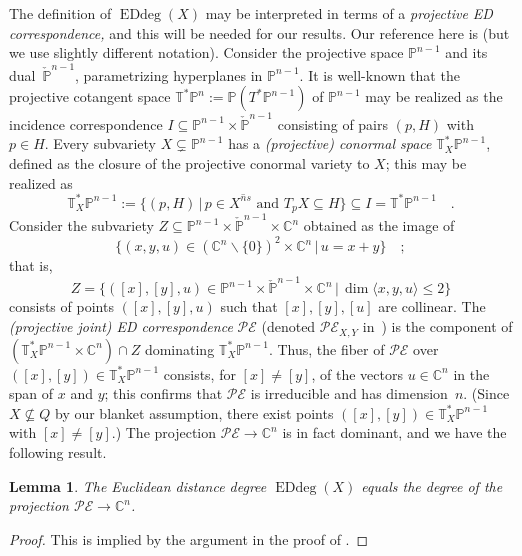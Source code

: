 \documentclass[11pt]{amsart}
\newtheorem{lemma}[theorem]{Lemma}
\numberwithin{equation}{section}
\newcommand{\Cbb}{{\mathbb{C}}}
\newcommand{\Pbb}{{\mathbb{P}}}
\newcommand{\cPbb}{{\check\Pbb}}
\newcommand{\Tbb}{{\mathbb{T}}}
\newcommand{\cE}{{\mathcal E}}
\newcommand{\cP}{{\mathcal P}}
\DeclareMathOperator{\Edd}{EDdeg}
\begin{document}
The definition of $\Edd(X)$ may be interpreted in terms of a {\em projective ED 
correspondence,\/} and this will be needed for our results. Our reference here is 
\cite[\S5]{MR3451425} (but we use slightly different notation).
Consider the projective space $\Pbb^{n-1}$ and its dual~$\cPbb^{n-1}$, parametrizing
hyperplanes in $\Pbb^{n-1}$. It is well-known that the projective cotangent space 
$\Tbb^*\Pbb^n:=\Pbb(T^*\Pbb^{n-1})$ of $\Pbb^{n-1}$ may be realized as the incidence 
correspondence  $I\subseteq \Pbb^{n-1}\times \cPbb^{n-1}$ consisting of pairs 
$(p,H)$ with $p\in H$. Every subvariety $X\subsetneq \Pbb^{n-1}$ has a {\em (projective) 
conormal space\/} $\Tbb^*_X\Pbb^{n-1}$, defined as the closure of the projective
conormal variety to $X$; this may be realized as
\[
\Tbb^*_X\Pbb^{n-1} := \overline{
\{ (p,H) \,|\, \text{$p\in X^{ns}$ and $T_pX\subseteq H$} \}
} \subseteq I=\Tbb^*\Pbb^{n-1}\quad.
\]
Consider the subvariety $Z\subseteq \Pbb^{n-1}\times \cPbb^{n-1}\times \Cbb^n$
obtained as the image of
\[
\{(x,y,u)\in (\Cbb^n\smallsetminus \{0\})^2\times \Cbb^n \,|\, u=x+y\}\quad;
\]
that is, 
\[
Z=\{([x],[y],u)\in \Pbb^{n-1}\times \cPbb^{n-1}\times \Cbb^n\,|\,
\dim \langle x,y,u\rangle \le 2\}
\]
consists of points $([x],[y],u)$ such that $[x],[y],[u]$ are collinear. The {\em (projective joint) 
ED correspondence\/} $\cP\cE$ (denoted $\cP\cE_{X,Y}$ in~\cite{MR3451425}) is the 
component of $(\Tbb^*_X\Pbb^{n-1}\times \Cbb^n)\cap Z$ dominating $\Tbb^*_X\Pbb^{n-1}$.
Thus, the fiber of $\cP\cE$ over $([x],[y])\in \Tbb^*_X\Pbb^{n-1}$ consists, for $[x]\ne
[y]$, of the vectors $u\in \Cbb^n$ in the span of $x$ and $y$; this confirms that $\cP\cE$ 
is irreducible and has dimension~$n$. (Since $X\not\subseteq Q$ by our blanket assumption, 
there exist points $([x],[y])\in \Tbb^*_X\Pbb^{n-1}$ with $[x]\ne [y]$.) The projection 
$\cP\cE \to \Cbb^n$ is in fact dominant, and we have the following result.

\begin{lemma}\label{lem:EDcor}
The Euclidean distance degree $\Edd(X)$ equals the degree of the projection
$\cP\cE \to \Cbb^n$.
\end{lemma}

\begin{proof}
This is implied by the argument in the proof of \cite[Proposition~5.4]{MR3451425}.
\end{proof}
\end{document}
